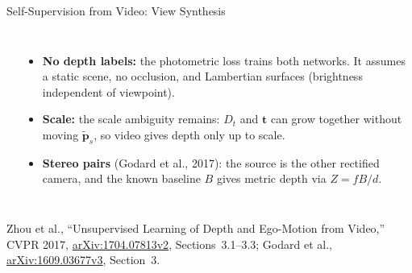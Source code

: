 \begin{frame}{Self-Supervision from Video: View Synthesis}
\begin{columns}[T,onlytextwidth]
\begin{itemize}
      \end{itemize}
      \begin{itemize}\footnotesize\itemsep0.2em
        \item \textbf{No depth labels:} the photometric loss trains both networks. It assumes a static scene, no occlusion, and Lambertian surfaces (brightness independent of viewpoint).
        \item \textbf{Scale:} the scale ambiguity remains: $D_t$ and $\mathbf{t}$ can grow together without moving $\tilde{\mathbf{p}}_s$, so video gives depth only up to scale.
        \item \textbf{Stereo pairs} (Godard et al., 2017): the source is the other rectified camera, and the known baseline $B$ gives metric depth via $Z = fB/d$.
      \end{itemize}
  \end{columns}
  \vspace{0.1em}
  {\raggedright\scriptsize Zhou et al., ``Unsupervised Learning of Depth and Ego-Motion from Video,'' CVPR 2017, \href{https://arxiv.org/abs/1704.07813v2}{arXiv:1704.07813v2}, Sections~3.1--3.3; Godard et al., \href{https://arxiv.org/abs/1609.03677v3}{arXiv:1609.03677v3}, Section~3.\par}
\end{frame}

